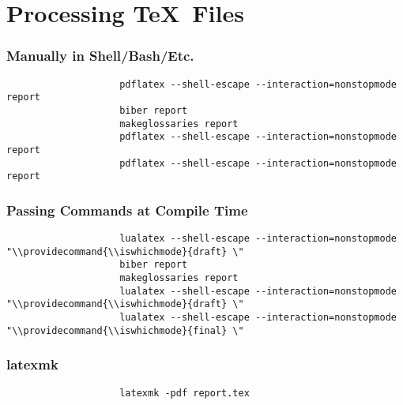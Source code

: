 \documentclass{beamer}
\begin{document}
    \section{Processing \TeX~Files}
        \begin{frame}[fragile]
            \frametitle{Manually in Shell/Bash/Etc.}
            \begin{centering}
                \begin{verbatim}
                    pdflatex --shell-escape --interaction=nonstopmode report
                    biber report
                    makeglossaries report
                    pdflatex --shell-escape --interaction=nonstopmode report
                    pdflatex --shell-escape --interaction=nonstopmode report
                \end{verbatim}
            \end{centering}
        \end{frame}
        \begin{frame}[fragile]
            \frametitle{Passing Commands at Compile Time}
            \begin{centering}
                \begin{verbatim}
                    lualatex --shell-escape --interaction=nonstopmode "\\providecommand{\\iswhichmode}{draft} \"
                    biber report
                    makeglossaries report
                    lualatex --shell-escape --interaction=nonstopmode "\\providecommand{\\iswhichmode}{draft} \"
                    lualatex --shell-escape --interaction=nonstopmode "\\providecommand{\\iswhichmode}{final} \"
                \end{verbatim}
            \end{centering}
        \end{frame}
        \begin{frame}[fragile]
            \frametitle{latexmk}
            \begin{centering}
                \begin{verbatim}
                    latexmk -pdf report.tex
                \end{verbatim}
            \end{centering}
        \end{frame}
\end{document}
